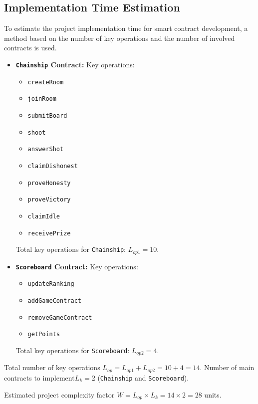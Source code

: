 \documentclass{article}
\begin{document}
    \subsection{Implementation Time Estimation}
    To estimate the project implementation time for smart contract development, a method based on the number of key operations and the number of involved contracts is used.

    \begin{itemize}
        \item \textbf{\texttt{Chainship} Contract:}
        Key operations:
        \begin{itemize}
            \item \texttt{createRoom}
            \item \texttt{joinRoom}
            \item \texttt{submitBoard}
            \item \texttt{shoot}
            \item \texttt{answerShot}
            \item \texttt{claimDishonest}
            \item \texttt{proveHonesty}
            \item \texttt{proveVictory}
            \item \texttt{claimIdle}
            \item \texttt{receivePrize}
        \end{itemize}
        Total key operations for \texttt{Chainship}: \(L_{op1} = 10\).

        \item \textbf{\texttt{Scoreboard} Contract:}
        Key operations:
        \begin{itemize}
            \item \texttt{updateRanking}
            \item \texttt{addGameContract}
            \item \texttt{removeGameContract}
            \item \texttt{getPoints}
        \end{itemize}
        Total key operations for \texttt{Scoreboard}: \(L_{op2} = 4\).
    \end{itemize}

    Total number of key operations \( L_{op} = L_{op1} + L_{op2} = 10 + 4 = 14 \).
    Number of main contracts to implement\( L_k = 2 \) (\texttt{Chainship} and \texttt{Scoreboard}).

    Estimated project complexity factor \( W = L_{op} \times L_k = 14 \times 2 = 28 \) units.
    
\end{document}
